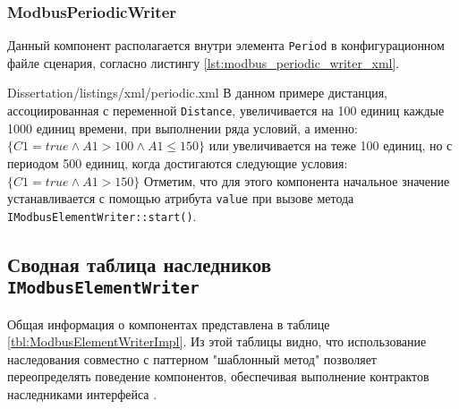 \subsubsection{ModbusPeriodicWriter}
Данный компонент располагается внутри элемента \texttt{Period} в конфигурационном файле сценария,
согласно листингу \ref{lst:modbus_periodic_writer_xml}.

        {Dissertation/listings/xml/periodic.xml}
В данном примере дистанция, ассоциированная с переменной \texttt{Distance}, увеличивается на 100 единиц каждые 1000 единиц времени,
при выполнении ряда условий, а именно: $\{C1 = true \wedge A1 > 100 \wedge A1 \le 150 \}$ или
увеличивается на теже 100 единиц, но с периодом 500 единиц, когда достигаются следующие условия:
$\{C1 = true \wedge A1 > 150\}$
Отметим, что для этого компонента начальное значение устанавливается с помощью атрибута \texttt{value}
при вызове метода \texttt{IModbusElementWriter::start()}.


\subsection{Сводная таблица наследников \texttt{IModbusElementWriter}}
Общая информация о компонентах представлена в таблице \ref{tbl:ModbusElementWriterImpl}.
Из этой таблицы видно, что использование наследования совместно с паттерном "шаблонный метод"
позволяет переопределять поведение компонентов, обеспечивая выполнение контрактов наследниками интерфейса
\cite[стр. 124-125]{book:oop:oop_analize}.

